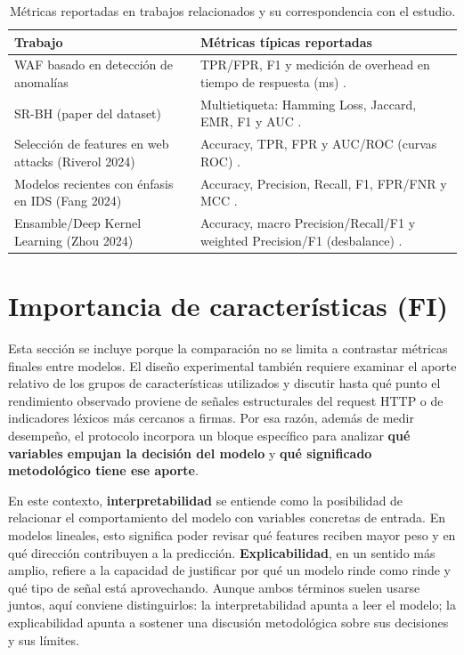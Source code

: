 \documentclass[12pt,oneside]{report}
\begin{document}
\begin{table}[H]
\centering
\caption{Métricas reportadas en trabajos relacionados y su correspondencia con el estudio.}
\label{tab:metricas_relacionadas}
\footnotesize
\setlength{\tabcolsep}{5pt}
\renewcommand{\arraystretch}{1.2}
\begin{tabularx}{\textwidth}{@{}L{3.6cm}Y@{}}
\toprule
\textbf{Trabajo} & \textbf{Métricas típicas reportadas} \\
\midrule
WAF basado en detección de anomalías & TPR/FPR, F1 y medición de overhead en tiempo de respuesta (ms) \cite{ocswaf_zenodo}. \\
SR-BH (paper del dataset) & Multietiqueta: Hamming Loss, Jaccard, EMR, F1 y AUC \cite{srbh_paper}. \\
Selección de features en web attacks (Riverol 2024) & Accuracy, TPR, FPR y AUC/ROC (curvas ROC) \cite{riverol_2024}. \\
Modelos recientes con énfasis en IDS (Fang 2024) & Accuracy, Precision, Recall, F1, FPR/FNR y MCC \cite{fang_2024,chicco_mcc}. \\
Ensamble/Deep Kernel Learning (Zhou 2024) & Accuracy, macro Precision/Recall/F1 y weighted Precision/F1 (desbalance) \cite{zhou_2024}. \\
\bottomrule
\end{tabularx}
\end{table}


\section{Importancia de características (FI)}
Esta sección se incluye porque la comparación no se limita a contrastar métricas finales entre modelos. El diseño experimental también requiere examinar el aporte relativo de los grupos de características utilizados y discutir hasta qué punto el rendimiento observado proviene de señales estructurales del request HTTP o de indicadores léxicos más cercanos a firmas. Por esa razón, además de medir desempeño, el protocolo incorpora un bloque específico para analizar \textbf{qué variables empujan la decisión del modelo} y \textbf{qué significado metodológico tiene ese aporte}.

En este contexto, \textbf{interpretabilidad} se entiende como la posibilidad de relacionar el comportamiento del modelo con variables concretas de entrada. En modelos lineales, esto significa poder revisar qué features reciben mayor peso y en qué dirección contribuyen a la predicción. \textbf{Explicabilidad}, en un sentido más amplio, refiere a la capacidad de justificar por qué un modelo rinde como rinde y qué tipo de señal está aprovechando. Aunque ambos términos suelen usarse juntos, aquí conviene distinguirlos: la interpretabilidad apunta a leer el modelo; la explicabilidad apunta a sostener una discusión metodológica sobre sus decisiones y sus límites.
\end{document}
